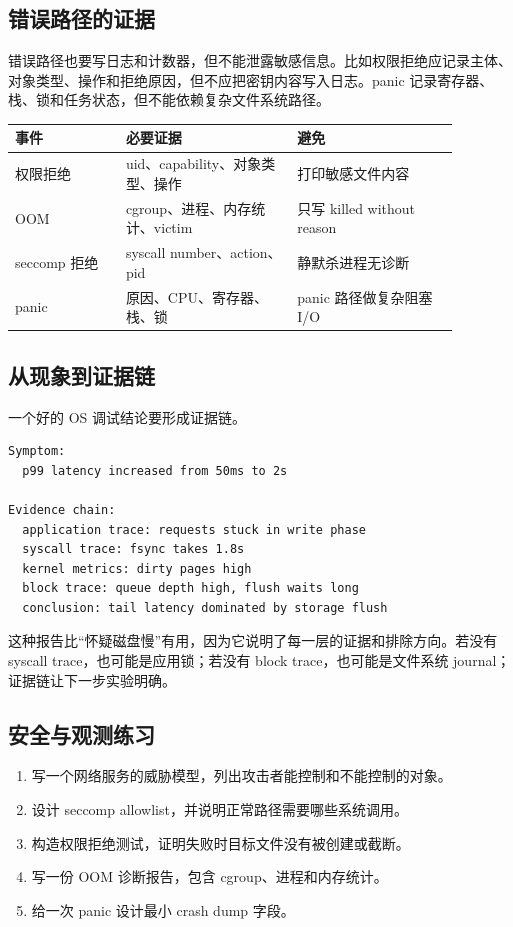 \subsection{错误路径的证据}

错误路径也要写日志和计数器，但不能泄露敏感信息。比如权限拒绝应记录主体、对象类型、操作和拒绝原因，但不应把密钥内容写入日志。panic 记录寄存器、栈、锁和任务状态，但不能依赖复杂文件系统路径。

\begin{longtable}{|p{0.22\linewidth}|p{0.34\linewidth}|p{0.32\linewidth}|}
\toprule
事件 & 必要证据 & 避免 \\
\midrule
权限拒绝 & uid、capability、对象类型、操作 & 打印敏感文件内容 \\\tablerowrule
OOM & cgroup、进程、内存统计、victim & 只写 killed without reason \\\tablerowrule
seccomp 拒绝 & syscall number、action、pid & 静默杀进程无诊断 \\\tablerowrule
panic & 原因、CPU、寄存器、栈、锁 & panic 路径做复杂阻塞 I/O \\
\bottomrule
\end{longtable}

\subsection{从现象到证据链}

一个好的 OS 调试结论要形成证据链。

\begin{lstlisting}
Symptom:
  p99 latency increased from 50ms to 2s

Evidence chain:
  application trace: requests stuck in write phase
  syscall trace: fsync takes 1.8s
  kernel metrics: dirty pages high
  block trace: queue depth high, flush waits long
  conclusion: tail latency dominated by storage flush
\end{lstlisting}

这种报告比“怀疑磁盘慢”有用，因为它说明了每一层的证据和排除方向。若没有 syscall trace，也可能是应用锁；若没有 block trace，也可能是文件系统 journal；证据链让下一步实验明确。

\subsection{安全与观测练习}

\begin{enumerate}
\tightlist
\item 写一个网络服务的威胁模型，列出攻击者能控制和不能控制的对象。
\item 设计 seccomp allowlist，并说明正常路径需要哪些系统调用。
\item 构造权限拒绝测试，证明失败时目标文件没有被创建或截断。
\item 写一份 OOM 诊断报告，包含 cgroup、进程和内存统计。
\item 给一次 panic 设计最小 crash dump 字段。
\end{enumerate}

